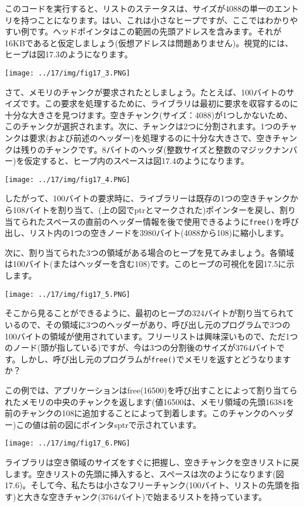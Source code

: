 このコードを実行すると、リストのステータスは、サイズが4088の単一のエントリを持つことになります。はい、これは小さなヒープですが、ここではわかりやすい例です。ヘッドポインタはこの範囲の先頭アドレスを含みます。それが16KBであると仮定しましょう(仮想アドレスは問題ありません)。視覚的には、ヒープは図17.3のようになります。

\texttt{[image: ../17/img/fig17\_3.PNG]}

さて、メモリのチャンクが要求されたとしましょう。たとえば、100バイトのサイズです。この要求を処理するために、ライブラリは最初に要求を収容するのに十分な大きさを見つけます。空きチャンク(サイズ：4088)が1つしかないため、このチャンクが選択されます。次に、チャンクは2つに分割されます。1つのチャンクは要求(および前述のヘッダー)を処理するのに十分な大きさで、空きチャンクは残りのチャンクです。8バイトのヘッダ(整数サイズと整数のマジックナンバー)を仮定すると、ヒープ内のスペースは図17.4のようになります。

\texttt{[image: ../17/img/fig17\_4.PNG]}

したがって、100バイトの要求時に、ライブラリーは既存の1つの空きチャンクから108バイトを割り当て、(上の図でptrとマークされた)ポインターを戻し、割り当てられたスペースの直前のヘッダー情報を後で使用できるように\texttt{free()}を呼び出し、リスト内の1つの空きノードを3980バイト(4088から108)に縮小します。

次に、割り当てられた3つの領域がある場合のヒープを見てみましょう。各領域は100バイト(またはヘッダーを含む108)です。このヒープの可視化を図17.5に示します。

\texttt{[image: ../17/img/fig17\_5.PNG]}

そこから見ることができるように、最初のヒープの324バイトが割り当てられているので、その領域に3つのヘッダーがあり、呼び出し元のプログラムで3つの100バイトの領域が使用されています。フリーリストは興味深いもので、ただ1つのノード(頭が指している)ですが、今は3つの分割後のサイズが3764バイトです。しかし、呼び出し元のプログラムが\texttt{free()}でメモリを返すとどうなりますか？

この例では、アプリケーションはfree(16500)を呼び出すことによって割り当てられたメモリの中央のチャンクを返します(値16500は、メモリ領域の先頭16384を前のチャンクの108に追加することによって到着します。このチャンクのヘッダー)この値は前の図にポインタsptrで示されています。

\texttt{[image: ../17/img/fig17\_6.PNG]}

ライブラリは空き領域のサイズをすぐに把握し、空きチャンクを空きリストに戻します。空きリストの先頭に挿入すると、スペースは次のようになります(図17.6)。そして今、私たちは小さなフリーチャンク(100バイト、リストの先頭を指す)と大きな空きチャンク(3764バイト)で始まるリストを持っています。

